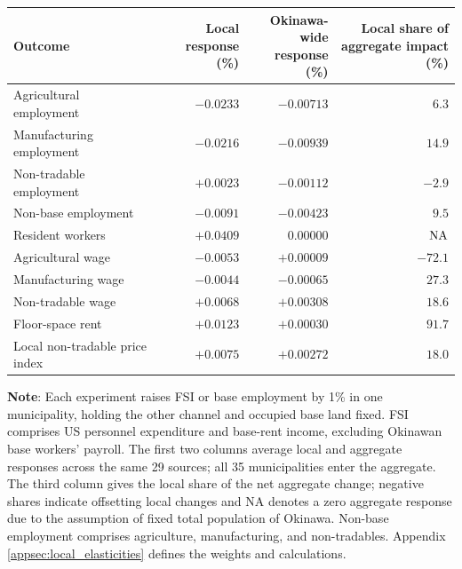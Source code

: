\documentclass[12pt, unicode, a4paper]{article}
\newcommand{\1}{\mbox{1}\hspace{-0.25em}\mbox{l}} %
\begin{document}
{\begin{table}[tbp]
\begin{threeparttable}
\begin{tabular*}{\textwidth}{@{\extracolsep{\fill}}lrrr@{}}
Outcome & \makecell[r]{Local response\\(\%)} & \makecell[r]{Okinawa-wide\\response (\%)} & \makecell[r]{Local share of\\aggregate impact (\%)} \\
\midrule
Agricultural employment & $-0.0233$ & $-0.00713$ & $6.3$ \\
Manufacturing employment & $-0.0216$ & $-0.00939$ & $14.9$ \\
Non-tradable employment & $+0.0023$ & $-0.00112$ & $-2.9$ \\
Non-base employment & $-0.0091$ & $-0.00423$ & $9.5$ \\
Resident workers & $+0.0409$ & $0.00000$ & $\textnormal{NA}$ \\
\addlinespace
Agricultural wage & $-0.0053$ & $+0.00009$ & $-72.1$ \\
Manufacturing wage & $-0.0044$ & $-0.00065$ & $27.3$ \\
Non-tradable wage & $+0.0068$ & $+0.00308$ & $18.6$ \\
Floor-space rent & $+0.0123$ & $+0.00030$ & $91.7$ \\
Local non-tradable price index & $+0.0075$ & $+0.00272$ & $18.0$ \\
\bottomrule
\end{tabular*}
\begin{tablenotes}[flushleft]
\footnotesize
\item \textbf{Note}: Each experiment raises FSI or base employment by 1\% in one municipality, holding the other channel and occupied base land fixed. FSI comprises US personnel expenditure and base-rent income, excluding Okinawan base workers' payroll. The first two columns average local and aggregate responses across the same 29 sources; all 35 municipalities enter the aggregate. The third column gives the local share of the net aggregate change; negative shares indicate offsetting local changes and NA denotes a zero aggregate response due to the assumption of fixed total population of Okinawa. Non-base employment comprises agriculture, manufacturing, and non-tradables.  Appendix \ref{appsec:local_elasticities} defines the weights and calculations.
\end{tablenotes}
\end{threeparttable}
\end{table}}
\end{document}
